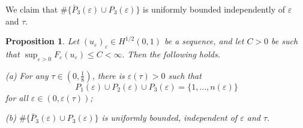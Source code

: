 \documentclass[12pt]{article}
\newtheorem{proposition}[definition]{Proposition}
\numberwithin{equation}{section}
\begin{document}
We claim that $\#\{\bar{P}_{3}(\varepsilon)\cup P_{3}(\varepsilon)\}$ is uniformly bounded independently of $\varepsilon$ and $\tau$.
\begin{proposition}\label{3.2}
Let $(u_{\varepsilon})_{\varepsilon}\in H^{1/2}(0,1)$ be a sequence, and let $C>0$ be such that $\sup_{\varepsilon>0} F_{\varepsilon}(u_{\varepsilon}) \le C < \infty.$ Then the following holds.

\smallskip
{\rm(a)} For any $\tau\in(0,\frac{1}{8})$, there is $\varepsilon(\tau)>0$ such that 
\[
P_{1}(\varepsilon)\cup P_{2}(\varepsilon)\cup P_{3}(\varepsilon)=\{1,...,n(\varepsilon)\}
\]
for all $\varepsilon\in(0,\varepsilon(\tau))$;

\smallskip
{\rm(b)} $\#\{\bar{P}_{3}(\varepsilon)\cup P_{3}(\varepsilon)\}$ is uniformly bounded, independent of $\varepsilon$ and $\tau$.  
\end{proposition}
\end{document}
